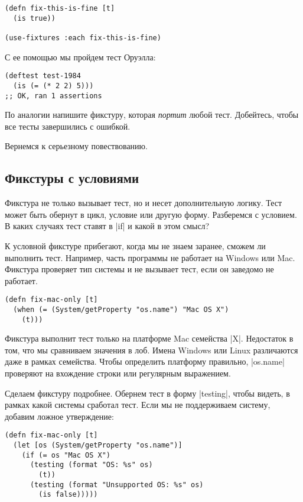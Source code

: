 \begin{verbatim}
(defn fix-this-is-fine [t]
  (is true))

(use-fixtures :each fix-this-is-fine)
\end{verbatim}

С ее помощью мы пройдем тест Оруэлла:

\begin{verbatim}
(deftest test-1984
  (is (= (* 2 2) 5)))
;; OK, ran 1 assertions
\end{verbatim}

По аналогии напишите фикстуру, которая \emph{портит} любой тест. Добейтесь,
чтобы все тесты завершились с ошибкой.

Вернемся к серьезному повествованию.

\subsection{Фикстуры с условиями}

Фикстура не только вызывает тест, но и несет дополнительную логику. Тест может
быть обернут в цикл, условие или другую форму. Разберемся с условием. В каких
случаях тест ставят в \spverb|if| и какой в этом смысл?

К условной фикстуре прибегают, когда мы не знаем заранее, сможем ли выполнить
тест. Например, часть программы не работает на Windows или Mac. Фикстура
проверяет тип системы и не вызывает тест, если он заведомо не работает.

\begin{verbatim}
(defn fix-mac-only [t]
  (when (= (System/getProperty "os.name") "Mac OS X")
    (t)))
\end{verbatim}

Фикстура выполнит тест только на платформе Mac семейства \spverb|X|. Недостаток
в том, что мы сравниваем значения в лоб. Имена Windows или Linux различаются
даже в рамках семейства. Чтобы определить платформу правильно, \spverb|os.name|
проверяют на вхождение строки или регулярным выражением.

Сделаем фикстуру подробнее. Обернем тест в форму \spverb|testing|, чтобы видеть,
в рамках какой системы сработал тест. Если мы не поддерживаем систему, добавим
ложное утверждение:

\begin{verbatim}
(defn fix-mac-only [t]
  (let [os (System/getProperty "os.name")]
    (if (= os "Mac OS X")
      (testing (format "OS: %s" os)
        (t))
      (testing (format "Unsupported OS: %s" os)
        (is false)))))
\end{verbatim}

